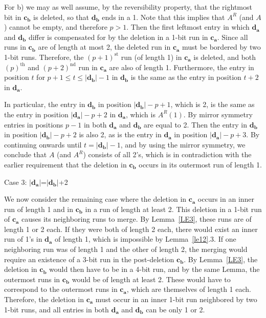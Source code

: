 For b) we may as well assume, by the reversibility property, that the
rightmost bit in $\mathbf{c_b}$ is deleted, so that $\mathbf{d_b}$
ends in a 1. Note that this implies that $A^R$ (and $A$) cannot be
empty, and therefore $p>1$. Then the first leftmost entry in which
$\mathbf{d_a}$ and $\mathbf{d_b}$ differ is compensated for by the
deletion in a 1-bit run in $\mathbf{c_a}$. Since all runs in
$\mathbf{c_b}$ are of length at most 2, the deleted run in
$\mathbf{c_a}$ must be bordered by two 1-bit runs. Therefore, the
$(p+1)^{\text{st}}$ run (of length 1) in $\mathbf{c_a}$ is deleted,
and both $(p)^{\text{th}}$ and $(p+2)^{\text{nd}}$ run in
$\mathbf{c_a}$ are also of length 1. Furthermore, the entry in
position $t$ for $p+1 \leq t \leq |\mathbf{d_b}|-1$ in
$\mathbf{d_b}$ is the same as the entry in position $t+2$ in
$\mathbf{d_a}$.

In particular, the entry in $\mathbf{d_b}$ in position
$|\mathbf{d_b}|-p+1$, which is 2, is the same as the entry in
position $|\mathbf{d_a}|-p+2$ in $\mathbf{d_a}$, which is
$A^R(1)$. By mirror symmetry entries in positions $p-1$ in both
$\mathbf{d_a}$ and $\mathbf{d_b}$ are equal to 2. Then the entry
in $\mathbf{d_b}$ in position $|\mathbf{d_b}|-p+2$ is also 2, as
is the entry in $\mathbf{d_a}$ in position $|\mathbf{d_a}|-p+3$.
By continuing onwards until $t = |\mathbf{d_b}|-1$, and by using
the mirror symmetry, we conclude that $A$ (and $A^R$) consists of
all 2's, which is in contradiction with the earlier requirement
that the deletion in $\mathbf{c_b}$ occurs in its outermost run of
length 1.


Case 3: $|\mathbf{d_a}|$=$|\mathbf{d_b}|$+2

We now consider the remaining case where the deletion in
$\mathbf{c_a}$ occurs in an inner run of length 1 and in
$\mathbf{c_b}$ in a run of length at least 2. This deletion in a
1-bit run of $\mathbf{c_a}$ causes its neighboring runs to merge.
By Lemma~\ref{LE3}, these runs are of length 1 or 2 each. If they
were both of length 2 each, there would exist an inner run of 1's
in $\mathbf{d_a}$ of length 1, which is impossible by
Lemma~\ref{le12}.3. If one neighboring run was of length 1 and the
other of length 2, the merging would require an existence of a
3-bit run in the post-deletion $\mathbf{c_b}$. By Lemma~\ref{LE3},
the deletion in $\mathbf{c_b}$ would then have to be in a 4-bit
run, and by the same Lemma, the outermost runs in $\mathbf{c_b}$
would be of length at least 2. These would have to correspond to
the outermost runs in $\mathbf{c_a}$, which are themselves of
length 1 each. Therefore, the deletion in $\mathbf{c_a}$ must
occur in an inner 1-bit run neighbored by two 1-bit runs, and all
entries in both $\mathbf{d_a}$ and $\mathbf{d_b}$ can be only 1 or
2.


